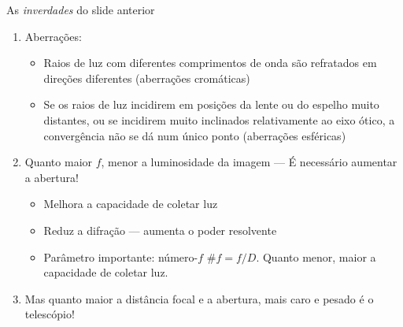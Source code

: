 \documentclass[beamer,9pt,aspectratio=169]{beamer}
\begin{document}
\begin{frame}{As \emph{inverdades} do slide anterior}
  \begin{enumerate}
    \setlength{\itemsep}{3em}
    \item
      Aberrações:
      \vspace{0.5em}
      \begin{itemize}
        \setlength{\itemsep}{1em}
        \item
          Raios de luz com diferentes comprimentos de onda são refratados em
          direções diferentes (aberrações cromáticas)
        \item
          Se os raios de luz incidirem em posições da lente ou do espelho muito
          distantes, ou se incidirem muito inclinados relativamente ao eixo
          ótico, a convergência não se dá num único ponto (aberrações
          esféricas)
        \end{itemize}
    \item
      Quanto maior $f$, menor a luminosidade da imagem --- É necessário aumentar
      a abertura!
      \vspace{0.5em}
      \begin{itemize}
        \setlength{\itemsep}{1em}
        \item Melhora a capacidade de coletar luz
        \item Reduz a difração --- aumenta o poder resolvente
        \item[] Parâmetro importante: número-$f$ \quad $\#f = f/D$. Quanto menor,
          maior a capacidade de coletar luz.
      \end{itemize}
    \item[] Mas quanto maior a distância focal e a abertura, mais caro e pesado
      é o telescópio!
  \end{enumerate}
\end{frame}
\end{document}
